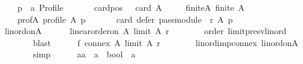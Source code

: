 \begin{isabellebody}
\ \ \ \ p\ {\isacharcolon}{\kern0pt}{\isacharcolon}{\kern0pt}\ {\isachardoublequoteopen}{\isacharprime}{\kern0pt}a\ Profile{\isachardoublequoteclose}\isanewline
\ \ \isamarkupfalse%
\isanewline
\ \ \ \ card{\isacharunderscore}{\kern0pt}pos{\isacharcolon}{\kern0pt}\ {\isachardoublequoteopen}{}\ {\isasymle}\ card\ A{\isachardoublequoteclose}\ \isanewline
\ \ \ \ finite{\isacharunderscore}{\kern0pt}A{\isacharcolon}{\kern0pt}\ {\isachardoublequoteopen}finite\ A{\isachardoublequoteclose}\ \isanewline
\ \ \ \ prof{\isacharunderscore}{\kern0pt}A{\isacharcolon}{\kern0pt}\ {\isachardoublequoteopen}profile\ A\ p{\isachardoublequoteclose}\isanewline
\ \ \isamarkupfalse%
\isanewline
\ \ \ \ {\isachardoublequoteopen}card\ {\isacharparenleft}{\kern0pt}defer\ {\isacharparenleft}{\kern0pt}pass{\isacharunderscore}{\kern0pt}module\ {}\ r{\isacharparenright}{\kern0pt}\ A\ p{\isacharparenright}{\kern0pt}\ {\isacharequal}{\kern0pt}\ {}{\isachardoublequoteclose}\isanewline
\ \ \isamarkupfalse%
\ {\isacharminus}{\kern0pt}\isanewline
\ \ \ \ \isamarkupfalse%
\ lin{\isacharunderscore}{\kern0pt}ord{\isacharunderscore}{\kern0pt}on{\isacharunderscore}{\kern0pt}A{\isacharcolon}{\kern0pt}\isanewline
\ \ \ \ \ \ {\isachardoublequoteopen}linear{\isacharunderscore}{\kern0pt}order{\isacharunderscore}{\kern0pt}on\ A\ {\isacharparenleft}{\kern0pt}limit\ A\ r{\isacharparenright}{\kern0pt}{\isachardoublequoteclose}\isanewline
\ \ \ \ \ \ \isamarkupfalse%
\ order\ limit{\isacharunderscore}{\kern0pt}presv{\isacharunderscore}{\kern0pt}lin{\isacharunderscore}{\kern0pt}ord\isanewline
\ \ \ \ \ \ \isamarkupfalse%
\ blast\isanewline
\ \ \ \ \isamarkupfalse%
\ f{}{\isacharcolon}{\kern0pt}\ {\isachardoublequoteopen}connex\ A\ {\isacharparenleft}{\kern0pt}limit\ A\ r{\isacharparenright}{\kern0pt}{\isachardoublequoteclose}\isanewline
\ \ \ \ \ \ \isamarkupfalse%
\ lin{\isacharunderscore}{\kern0pt}ord{\isacharunderscore}{\kern0pt}imp{\isacharunderscore}{\kern0pt}connex\ lin{\isacharunderscore}{\kern0pt}ord{\isacharunderscore}{\kern0pt}on{\isacharunderscore}{\kern0pt}A\isanewline
\ \ \ \ \ \ \isamarkupfalse%
\ simp\isanewline
\ \ \ \ \isamarkupfalse%
\ aa\ {\isacharcolon}{\kern0pt}{\isacharcolon}{\kern0pt}\ {\isachardoublequoteopen}{\isacharparenleft}{\kern0pt}{\isacharprime}{\kern0pt}a\ {\isasymRightarrow}\ bool{\isacharparenright}{\kern0pt}\ {\isasymRightarrow}\ {\isacharprime}{\kern0pt}a{\isachardoublequoteclose}\ \isanewline

\end{isabellebody}
